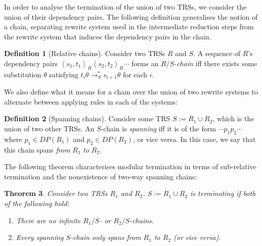 \documentclass{article}
\newtheorem{theorem}{Theorem}%
\theoremstyle{definition}
\newtheorem{definition}[theorem]{Definition}
\newcommand{\dpair}[2]{\left\langle #1, #2 \right\rangle}
\begin{document}
In order to analyse the termination of the union of two TRSs, we consider the union of their dependency pairs. The following definition generalises the notion of a chain, separating rewrite system used in the intermediate reduction steps from the rewrite system that induces the dependency pairs in the chain.

\begin{definition}[Relative chains]
    Consider two TRSs $R$ and $S$. A sequence of $R$'s dependency pairs $\dpair{s_1}{t_1}_R \dpair{s_2}{t_2}_R \cdots$ forms an \emph{$R/S$-chain} iff there exists some substitution $\theta$ satisfying $t_i \theta \rightarrow^*_S s_{i+1}\theta$ for each $i$. 
\end{definition}

We also define what it means for a chain over the union of two rewrite systems to alternate between applying rules in each of the systems:
\begin{definition}[Spanning chains]
    Consider some TRS $S := R_1 \cup R_2$, which is the union of two other TRSs. An $S$-chain is \emph{spanning} iff it is of the form $\cdots p_1 p_2 \cdots$ where $p_1 \in DP(R_1)$ and $p_2 \in DP(R_2)$, or vice versa. In this case, we say that this chain spans \emph{from} $R_1$ \emph{to} $R_2$.
\end{definition}
The following theorem characterises modular termination in terms of sub-relative termination and the nonexistence of two-way spanning chains:
\begin{theorem} \label{thm:mod_span_term}
    Consider two TRSs $R_1$ and $R_2$. $S := R_1 \cup R_2$ is terminating if both of the following hold: \begin{enumerate}
        \item There are no infinite $R_1/S$- or $R_2/S$-chains. \label{cond:no_r_chains}
        \item Every spanning $S$-chain only spans from $R_1$ to $R_2$ (or vice versa). \label{cond:no_span_chains}
    \end{enumerate}
\end{theorem}
\end{document}
